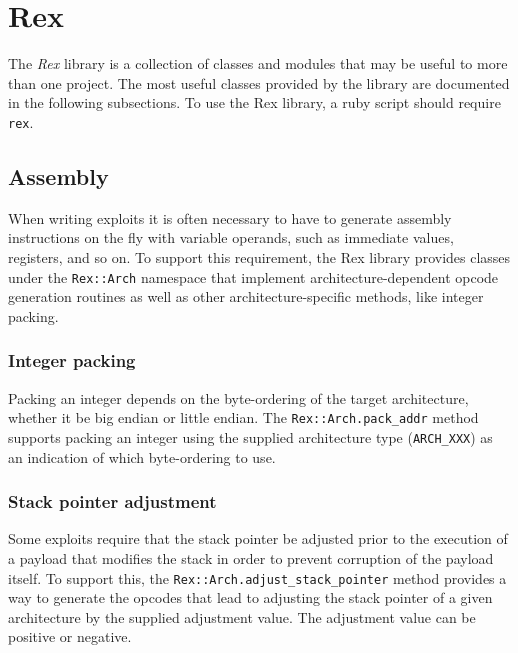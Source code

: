 \documentclass{report}
\begin{document}
\chapter{Rex}

\par
The \textit{Rex} library is a collection of classes and modules that
may be useful to more than one project.  The most useful classes
provided by the library are documented in the following subsections.
To use the Rex library, a ruby script should require \texttt{rex}.

    \section{Assembly}

\par
When writing exploits it is often necessary to have to generate
assembly instructions on the fly with variable operands, such as
immediate values, registers, and so on.  To support this
requirement, the Rex library provides classes under the
\texttt{Rex::Arch} namespace that implement architecture-dependent
opcode generation routines as well as other architecture-specific
methods, like integer packing.

        \subsection{Integer packing}

\par
Packing an integer depends on the byte-ordering of the target
architecture, whether it be big endian or little endian.  The
\texttt{Rex::Arch.pack\_addr} method supports packing an integer
using the supplied architecture type (\texttt{ARCH\_XXX}) as an
indication of which byte-ordering to use.

        \subsection{Stack pointer adjustment}

\par
Some exploits require that the stack pointer be adjusted prior to
the execution of a payload that modifies the stack in order to
prevent corruption of the payload itself.  To support this, the
\texttt{Rex::Arch.adjust\_stack\_pointer} method provides a way to
generate the opcodes that lead to adjusting the stack pointer of a
given architecture by the supplied adjustment value.  The adjustment
value can be positive or negative.
\end{document}
